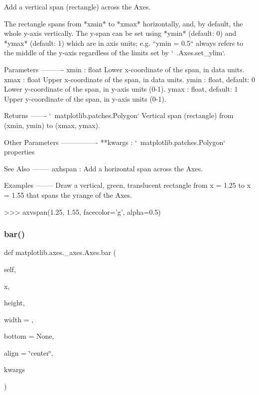 \begin{DoxyVerb}Add a vertical span (rectangle) across the Axes.

The rectangle spans from *xmin* to *xmax* horizontally, and, by
default, the whole y-axis vertically.  The y-span can be set using
*ymin* (default: 0) and *ymax* (default: 1) which are in axis units;
e.g. ``ymin = 0.5`` always refers to the middle of the y-axis
regardless of the limits set by `~.Axes.set_ylim`.

Parameters
----------
xmin : float
    Lower x-coordinate of the span, in data units.
xmax : float
    Upper x-coordinate of the span, in data units.
ymin : float, default: 0
    Lower y-coordinate of the span, in y-axis units (0-1).
ymax : float, default: 1
    Upper y-coordinate of the span, in y-axis units (0-1).

Returns
-------
`~matplotlib.patches.Polygon`
    Vertical span (rectangle) from (xmin, ymin) to (xmax, ymax).

Other Parameters
----------------
**kwargs : `~matplotlib.patches.Polygon` properties


See Also
--------
axhspan : Add a horizontal span across the Axes.

Examples
--------
Draw a vertical, green, translucent rectangle from x = 1.25 to
x = 1.55 that spans the yrange of the Axes.

>>> axvspan(1.25, 1.55, facecolor='g', alpha=0.5)\end{DoxyVerb}
 \mbox{\label{classmatplotlib_1_1axes_1_1__axes_1_1Axes_abedbbc828dec3e3c060e79b5cdb8aced}} 
\subsubsection{\texorpdfstring{bar()}{bar()}}
{\footnotesize\ttfamily def matplotlib.\+axes.\+\_\+axes.\+Axes.\+bar (\begin{DoxyParamCaption}\item[{}]{self,  }\item[{}]{x,  }\item[{}]{height,  }\item[{}]{width = {},  }\item[{}]{bottom = {\ttfamily None},  }\item[{}]{align = {\ttfamily \char`\"{}center\char`\"{}},  }\item[{}]{kwargs }\end{DoxyParamCaption})}

